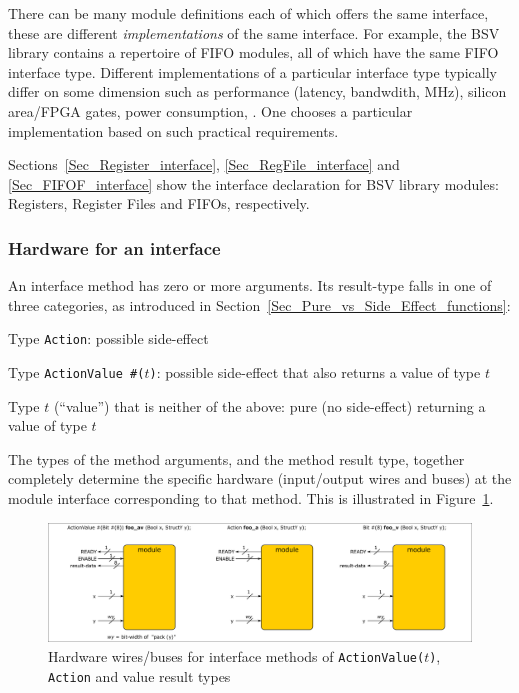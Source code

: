 There can be many module definitions each of which offers the same
interface, {\ie} these are different \emph{implementations} of the
same interface.  For example, the BSV library contains a repertoire of
FIFO modules, all of which have the same FIFO interface type.
Different implementations of a particular interface type typically
differ on some dimension such as performance (latency, bandwdith,
MHz), silicon area/FPGA gates, power consumption, {\etc}.  One chooses
a particular implementation based on such practical requirements.

Sections~\ref{Sec_Register_interface}, \ref{Sec_RegFile_interface} and
\ref{Sec_FIFOF_interface} show the interface declaration for BSV
library modules: Registers, Register Files and FIFOs, respectively.


\subsubsection{Hardware for an interface}

\label{Sec_Interface_HW}

An interface method has zero or more arguments.  Its result-type falls
in one of three categories, as introduced in
Section~\ref{Sec_Pure_vs_Side_Effect_functions}:
\begin{tightlist}

 \item Type {\tt Action}: possible side-effect

 \item Type {\tt ActionValue \#($t$)}: possible side-effect
       that also returns a value of type $t$

 \item Type $t$ (``value'') that is neither of the above: pure (no
       side-effect) returning a value of type $t$

\end{tightlist}

The types of the method arguments, and the method result type,
together completely determine the specific hardware (input/output
wires and buses) at the module interface corresponding to that method.
This is illustrated in Figure~\ref{Fig_Interface_Buses}.
\begin{figure}[htbp]
  \centerline{\includegraphics[width=6in,angle=0]{Figures/Fig_Interface_Buses}}
  \caption{\label{Fig_Interface_Buses}
           Hardware wires/buses for interface methods of {\tt ActionValue($t$)}, {\tt Action} and value result types}
\end{figure}

